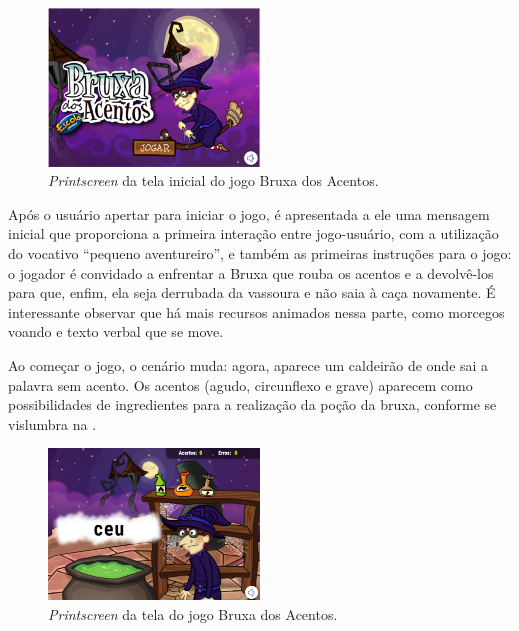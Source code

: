 \documentclass{textolivre}
\begin{document}
\begin{figure}[htbp]
 \centering
 \includegraphics[width=0.5\textwidth]{fig1.png}
 \caption{\emph{Printscreen} da tela inicial do jogo Bruxa dos Acentos.}
 \label{fig1}
\end{figure}

Após o usuário apertar para iniciar o jogo, é apresentada a ele uma mensagem inicial que proporciona a primeira interação entre jogo-usuário, com a utilização do vocativo “pequeno aventureiro”, e também as primeiras instruções para o jogo: o jogador é convidado a enfrentar a Bruxa que rouba os acentos e a devolvê-los para que, enfim, ela seja derrubada da vassoura e não saia à caça novamente. É interessante observar que há mais recursos animados nessa parte, como morcegos voando e texto verbal que se move.

Ao começar o jogo, o cenário muda: agora, aparece um caldeirão de onde sai a palavra sem acento. Os acentos (agudo, circunflexo e grave) aparecem como possibilidades de ingredientes para a realização da poção da bruxa, conforme se vislumbra na .

\begin{figure}[htbp]
 \centering
 \includegraphics[width=0.5\textwidth]{fig2.png}
 \caption{\emph{Printscreen} da tela do jogo Bruxa dos Acentos.}
 \label{fig2}
\end{figure}
\end{document}
